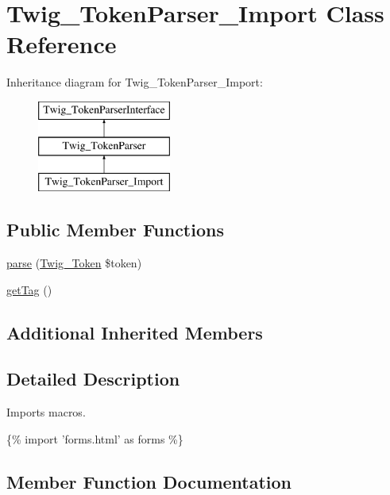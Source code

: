 \hypertarget{class_twig___token_parser___import}{}\section{Twig\+\_\+\+Token\+Parser\+\_\+\+Import Class Reference}
\label{class_twig___token_parser___import}
Inheritance diagram for Twig\+\_\+\+Token\+Parser\+\_\+\+Import\+:\begin{figure}[H]
\begin{center}
\leavevmode
\includegraphics[height=3.000000cm]{class_twig___token_parser___import}
\end{center}
\end{figure}
\subsection*{Public Member Functions}
\begin{DoxyCompactItemize}
\item 
\hyperlink{class_twig___token_parser___import_a5dfa2e269321584fb74e8b43dabe0efd}{parse} (\hyperlink{class_twig___token}{Twig\+\_\+\+Token} \$token)
\item 
\hyperlink{class_twig___token_parser___import_ab86ba36154b20e6bbfa3ba705f12f9d6}{get\+Tag} ()
\end{DoxyCompactItemize}
\subsection*{Additional Inherited Members}


\subsection{Detailed Description}
Imports macros.


\begin{DoxyPre}
  \{\% import 'forms.html' as forms \%\}
\end{DoxyPre}
 

\subsection{Member Function Documentation}
\hypertarget{class_twig___token_parser___import_ab86ba36154b20e6bbfa3ba705f12f9d6}{}

